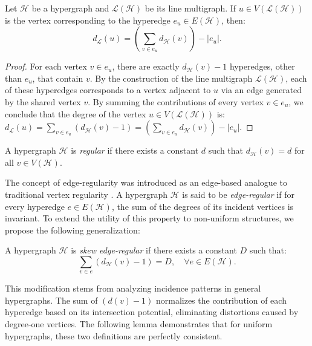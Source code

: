 \documentclass[12pt,reqno]{amsart}
\begin{document}
\begin{lemma}\label{lem:graulinha}
Let $\mathcal{H}$ be a hypergraph and $\mathcal{L}(\mathcal{H})$ be its line multigraph. If $u \in V(\mathcal{L}(\mathcal{H}))$ is the vertex corresponding to the hyperedge $e_u \in E(\mathcal{H})$, then:
	$$d_{\mathcal{L}}(u) = \left( \sum_{v \in e_u} d_{\mathcal{H}}(v) \right) - |e_u|.$$
\end{lemma}
\begin{proof}
For each vertex $v \in e_u$, there are exactly $d_{\mathcal{H}}(v) - 1$ hyperedges, other than $e_u$, that contain $v$. By the construction of the line multigraph $\mathcal{L}(\mathcal{H})$, each of these hyperedges corresponds to a vertex adjacent to $u$ via an edge generated by the shared vertex $v$. By summing the contributions of every vertex $v \in e_u$, we conclude that the degree of the vertex $u \in V(\mathcal{L}(\mathcal{H}))$ is:
$d_{\mathcal{L}}(u) = \sum_{v \in e_u} (d_{\mathcal{H}}(v) - 1) = \left( \sum_{v \in e_u} d_{\mathcal{H}}(v) \right) - |e_u|.$
\end{proof}

\begin{definition}\label{def:regular}
A hypergraph $\mathcal{H}$ is \textit{regular} if there exists a constant $d$ such that $d_{\mathcal{H}}(v) = d$ for all $v \in V(\mathcal{H})$.
\end{definition}

The concept of edge-regularity was introduced as an edge-based analogue to traditional vertex regularity \cite{kaue-sign-vector}. A hypergraph $\mathcal{H}$ is said to be \textit{edge-regular} if for every hyperedge $e \in E(\mathcal{H})$, the sum of the degrees of its incident vertices is invariant. To extend the utility of this property to non-uniform structures, we propose the following generalization:

\begin{definition}\label{def:skew_regular}
A hypergraph $\mathcal{H}$ is \textit{skew edge-regular} if there exists a constant $D$ such that:
$$\sum_{v \in e} (d_{\mathcal{H}}(v) - 1) = D, \quad \forall e \in E(\mathcal{H}).$$
\end{definition}

This modification stems from analyzing incidence patterns in general hypergraphs. The sum of $(d(v) - 1)$ normalizes the contribution of each hyperedge based on its intersection potential, eliminating distortions caused by degree-one vertices. The following lemma demonstrates that for uniform hypergraphs, these two definitions are perfectly consistent.
\end{document}
